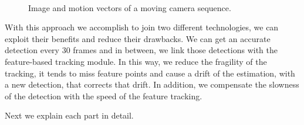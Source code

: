 \begin{figure}[H]
		
\centering

\\
\caption{Image and motion vectors of a moving camera sequence.}
\label{systemintro2}
\end{figure}




With this approach we accomplish to join two different technologies, we can exploit their benefits and reduce their drawbacks. We can get an accurate detection every $30$ frames and in between, we link those detections with the feature-based tracking module. In this way, we reduce the fragility of the tracking, it tends to miss feature points and cause a drift of the estimation, with a new detection, that corrects that drift. In addition, we compensate the slowness of the detection with the speed of the feature tracking.



Next we explain each part in detail.

